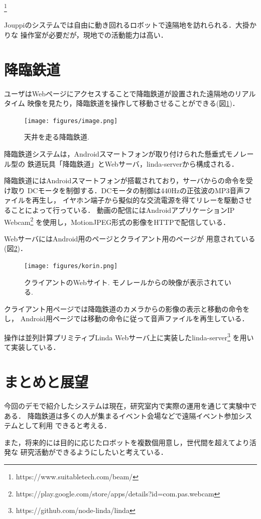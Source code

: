 \documentclass[submit,techreq]{ipsj}
\begin{document}
\footnote{
  \textsf{https://www.suitabletech.com/beam/}
}

Jouppiのシステム\cite{Jouppi:2002:FST:587078.587128}では自由に動き回れるロボットで遠隔地を訪れられる．大掛かりな
操作室が必要だが，現地での活動能力は高い．

\section{降臨鉄道}

ユーザはWebページにアクセスすることで降臨鉄道が設置された遠隔地のリアルタイム
映像を見たり，降臨鉄道を操作して移動させることができる(図\ref{monorail})．

\begin{figure}[H]
\begin{center}
\texttt{[image: figures/image.png]}
\end{center}
\caption{天井を走る降臨鉄道.}
\label{monorail}
\end{figure}


降臨鉄道システムは，Androidスマートフォンが取り付けられた懸垂式モノレール型の
鉄道玩具「降臨鉄道」とWebサーバ，linda-serverから構成される．

降臨鉄道にはAndroidスマートフォンが搭載されており，サーバからの命令を受け取り
DCモータを制御する．DCモータの制御は440Hzの正弦波のMP3音声ファイルを再生し，
イヤホン端子から擬似的な交流電源を得てリレーを駆動させることによって行っている．
動画の配信にはAndroidアプリケーションIP Webcam\footnote{
  \textsf{https://play.google.com/store/apps/details?id=com.pas.webcam}
}
を使用し，MotionJPEG形式の影像をHTTPで配信している．

WebサーバにはAndroid用のページとクライアント用のページが
用意されている(図\ref{browser})．

\begin{figure}[H]
\begin{center}
\texttt{[image: figures/korin.png]}
\end{center}
\caption{クライアントのWebサイト. モノレールからの映像が表示されている.}
\label{browser}
\end{figure}

クライアント用ページでは降臨鉄道のカメラからの影像の表示と移動の命令をし，
Android用ページでは移動の命令に従って音声ファイルを再生している．

操作は並列計算プリミティブLinda\cite{Carriero:1989:LC:63334.63337}
Webサーバ上に実装したlinda-server\footnote{
  \textsf{https://github.com/node-linda/linda}
}
を用いて実装している．

\section{まとめと展望}

今回のデモで紹介したシステムは現在，研究室内で実際の運用を通じて実験中である．
降臨鉄道は多くの人が集まるイベント会場などで遠隔イベント参加システムとして利用
できると考える．

また，将来的には目的に応じたロボットを複数個用意し，世代間を超えてより活発な
研究活動ができるようにしたいと考えている．

{\scriptsize


}
\end{document}
